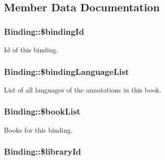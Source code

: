\subsection{Member Data Documentation}
\hypertarget{classBinding_ac145987d9c0aca2442c63a92a085ef03}{
\subsubsection[{\$bindingId}]{\setlength{\rightskip}{0pt plus 5cm}Binding::\$bindingId}}
\label{classBinding_ac145987d9c0aca2442c63a92a085ef03}
Id of this binding. \hypertarget{classBinding_a9ef17d4d6732c18b6a3ac4b48483ef90}{
\subsubsection[{\$bindingLanguageList}]{\setlength{\rightskip}{0pt plus 5cm}Binding::\$bindingLanguageList}}
\label{classBinding_a9ef17d4d6732c18b6a3ac4b48483ef90}
List of all languages of the annotations in this book. \hypertarget{classBinding_abf327f008d27256a4756e6e08819d87b}{
\subsubsection[{\$bookList}]{\setlength{\rightskip}{0pt plus 5cm}Binding::\$bookList}}
\label{classBinding_abf327f008d27256a4756e6e08819d87b}
Books for this binding. \hypertarget{classBinding_a9e88a985a9d2097135f01ef49a1c3114}{
\subsubsection[{\$libraryId}]{\setlength{\rightskip}{0pt plus 5cm}Binding::\$libraryId}}
\label{classBinding_a9e88a985a9d2097135f01ef49a1c3114}
